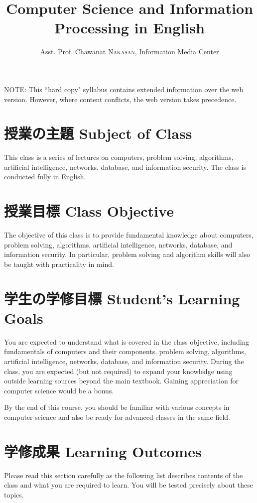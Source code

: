 \documentclass[a4paper]{article}
\title{Computer Science and Information Processing \newline
[情報の科学] in English}
\author{Asst. Prof. Chawanat \textsc{Nakasan}, Information Media Center}
\date{}
\begin{document}
\maketitle

\noindent
NOTE: This ``hard copy" syllabus contains extended information over the web version. However, where content conflicts, the web version takes precedence.

\section{授業の主題 Subject of Class}
This class is a series of lectures on computers, problem solving, algorithms, artificial intelligence, networks, database, and information security.
The class is conducted fully in English.

\section{授業目標 Class Objective}
The objective of this class is to provide fundamental knowledge about computers, problem solving, algorithms, artificial intelligence, networks, database, and information security.
In particular, problem solving and algorithm skills will also be taught with practicality in mind.

\section{学生の学修目標 Student's Learning Goals}
You are expected to understand what is covered in the class objective, including fundamentals of computers and their components, problem solving, algorithms, artificial intelligence, networks, database, and information security. During the class, you are expected (but not required) to expand your knowledge using outside learning sources beyond the main textbook. Gaining appreciation for computer science would be a bonus.

By the end of this course, you should be familiar with various concepts in computer science and also be ready for advanced classes in the same field.

\section{学修成果 Learning Outcomes}
\label{goals}
Please read this section carefully as the following list describes contents of the class and what you are required to learn. You will be tested precisely about these topics.
\end{document}
